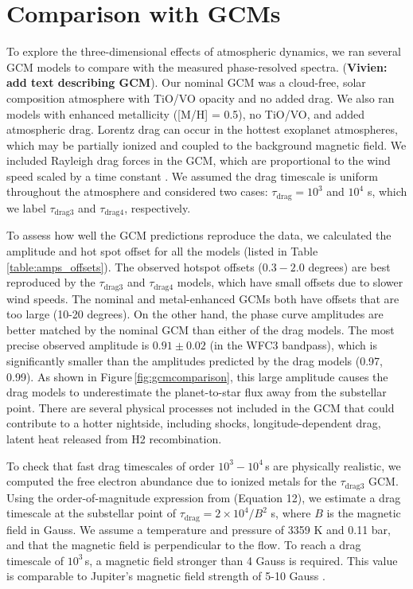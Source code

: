 \documentclass[twocolumn]{aastex61}
\begin{document}
\section{Comparison with GCMs}
\label{sec:gcm}
To explore the three-dimensional effects of atmospheric dynamics, we ran several GCM models to compare with the measured phase-resolved spectra. (\textbf{Vivien: add text describing GCM}).  Our nominal GCM was a cloud-free, solar composition atmosphere with TiO/VO opacity and no added drag.  We also ran models with enhanced metallicity ([M/H] = 0.5), no TiO/VO, and added atmospheric drag.  Lorentz drag can occur in the hottest exoplanet atmospheres, which may be partially ionized and coupled to the background magnetic field. We included Rayleigh drag forces in the GCM, which are proportional to the wind speed scaled by a time constant \citep[$F_\mathrm{drag} \propto -v/\tau_\mathrm{drag}$;][]{menou09}. We assumed the drag timescale is uniform throughout the atmosphere and considered two cases: $\tau_\mathrm{drag} = 10^3$ and $10^4$ s, which we label $\tau_\mathrm{drag3}$ and $\tau_\mathrm{drag4}$, respectively.

To assess how well the GCM predictions reproduce the data, we calculated the amplitude and hot spot offset for all the models (listed in Table\,\ref{table:amps_offsets}). The observed hotspot offsets ($0.3 - 2.0$ degrees) are best reproduced by the $\tau_\mathrm{drag3}$ and $\tau_\mathrm{drag4}$ models, which have small offsets due to slower wind speeds.  The nominal and metal-enhanced GCMs both have offsets that are too large (10-20 degrees). On the other hand, the phase curve amplitudes are better matched by the nominal GCM than either of the drag models. The most precise observed amplitude is $0.91\pm0.02$ (in the WFC3 bandpass), which is significantly smaller than the amplitudes predicted by the drag models (0.97, 0.99). As shown in Figure\,\ref{fig:gcmcomparison}, this large amplitude causes the drag models to underestimate the planet-to-star flux away from the substellar point. There are several physical processes not included in the GCM that could contribute to a hotter nightside, including shocks, longitude-dependent drag, latent heat released from H2 recombination. 

To check that fast drag timescales of order $10^3 - 10^4$\,s are physically realistic, we computed the free electron abundance due to ionized metals for the $\tau_\mathrm{drag3}$ GCM. Using the order-of-magnitude expression from \cite{perna10} (Equation 12), we estimate a drag timescale at the substellar point of $\tau_\mathrm{drag}  = 2\times10^4/B^2$ s, where $B$ is the magnetic field in Gauss. We assume a temperature and pressure of 3359 K and 0.11 bar, and that the magnetic field is perpendicular to the flow. To reach a drag timescale of $10^3$\,s, a magnetic field stronger than 4 Gauss is required. This value is comparable to Jupiter's magnetic field strength of 5-10 Gauss \citep{bagenal04}.
\end{document}

